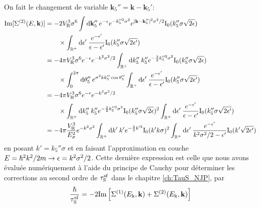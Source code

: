 On fait le changement de variable $\mathbf{k}_{\mathrm{5}}''=\mathbf{k}-\mathbf{k}_{\mathrm{5}}'$:
\begin{align}
\mathrm{Im}[ \Sigma^{(2)}(E,\mathbf{k})]&= -2V_{\mathrm{R}}^3\sigma^6 \int{\mathop{}\mathopen{}\mathrm{d}\mathbf{k}_{\mathrm{5}}'' \: e^{-\epsilon} e^{-k_{\mathrm{5}}''^2\sigma^2} e^{|\mathbf{k}-\mathbf{k}_{\mathrm{5}}''|^2\sigma^2/2} \mathrm{I_0}(k_{\mathrm{5}}''\sigma \sqrt{2\epsilon})} \\
&\nonumber\qquad \times \int_{\mathbb{R}^+}{\mathop{}\mathopen{}\mathrm{d}\epsilon' \: \frac{e^{-\epsilon'}}{\epsilon-\epsilon'} \mathrm{I_0}(k_{\mathrm{5}}'' \sigma \sqrt{2\epsilon'})} \\
&=-4 \pi V_{\mathrm{R}}^3\sigma^6 e^{-\epsilon} e^{-k^2\sigma^2/2} \int_{\mathbb{R}^+}{\mathop{}\mathopen{}\mathrm{d} k_{\mathrm{5}}'' \: k_{\mathrm{5}}'' e^{-\frac{3}{2}k_{\mathrm{5}}''^2 \sigma^2} \mathrm{I_0}(k_{\mathrm{5}}'' \sigma \sqrt{2\epsilon})} \\
&\nonumber \qquad \times \int_0^{2\pi}{\mathop{}\mathopen{}\mathrm{d}\theta_{\mathrm{5}}'' \: e^{\sigma^2 k k_{\mathrm{5}}'' \cos\theta_{\mathrm{5}}''} \int_{\mathbb{R}^+}{\mathop{}\mathopen{}\mathrm{d} \epsilon' \: \frac{e^{-\epsilon'}}{\epsilon-\epsilon'} \mathrm{I_0}(k_{\mathrm{5}}'' \sigma \sqrt{2\epsilon'})}} \\
&=-4 \pi V_{\mathrm{R}}^3\sigma^6 e^{-\epsilon} e^{-k^2\sigma^2/2} \\
&\nonumber \qquad \times\int_{\mathbb{R}^+}{\mathop{}\mathopen{}\mathrm{d} k_{\mathrm{5}}'' \: k_{\mathrm{5}}'' e^{-\frac{3}{2}k_{\mathrm{5}}''^2 \sigma^2} \mathrm{I_0}(k_{\mathrm{5}}'' \sigma \sqrt{2\epsilon})^2 \int_{\mathbb{R}^+}{\mathop{}\mathopen{}\mathrm{d} \epsilon' \: \frac{e^{-\epsilon'}}{\epsilon-\epsilon'} \mathrm{I_0}(k_{\mathrm{5}}'' \sigma \sqrt{2\epsilon'})}} \\
&= -4 \pi \frac{V_{\mathrm{R}}^3}{E_{\sigma}^2} e^{-k^2\sigma^2} \int_{\mathbb{R}^+}{\mathop{}\mathopen{}\mathrm{d} k' \: k' e^{-\frac{3}{2}k'^2} \mathrm{I_0}(k' k \sigma)^2 \int_{\mathbb{R}^+}{\mathop{}\mathopen{}\mathrm{d} \epsilon' \: \frac{e^{-\epsilon'}}{k^2\sigma^2/2-\epsilon'} \mathrm{I_0}(k' \sqrt{2\epsilon'})}}
\end{align}
en posant $k'=k_{\mathrm{5}}''\sigma$ et en faisant l'approximation en couche $E=\hslash^2k^2/2m \rightarrow \epsilon=k^2\sigma^2/2$. Cette dernière expression est celle que nous avons évaluée numériquement à l'aide du principe de Cauchy pour déterminer les corrections au second ordre de $\tau_{\mathrm{S}}^{\mathrm{sf}}$ dans le chapitre \ref{ch:TauS_NJP}, par
\begin{equation}
\frac{\hslash}{\tau_{\mathrm{S}}^{\mathrm{sf}}}=-2 \mathrm{Im}\left[\Sigma^{(1)}(E_{\mathrm{k}},\mathbf{k})+\Sigma^{(2)}(E_{\mathrm{k}},\mathbf{k})\right]
\end{equation}